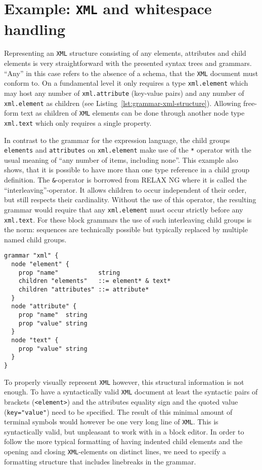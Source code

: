 \documentclass[sigconf,natbib=false]{acmart}
\newcommand{\enquote}[1]{``#1''}
\begin{document}
\section{Example: \texttt{XML} and whitespace handling}

Representing an \texttt{XML} structure consisting of any elements, attributes and child elements is very straightforward with the presented syntax trees and grammars. \enquote{Any} in this case refers to the absence of a schema, that the \texttt{XML} document must conform to. On a fundamental level it only requires a type \texttt{xml.element} which may host any number of \texttt{xml.attribute} (key-value pairs) and any number of \texttt{xml.element} as children (see Listing~\ref{lst:grammar-xml-structure}). Allowing free-form text as children of \texttt{XML} elements can be done through another node type \texttt{xml.text} which only requires a single property.

In contrast to the grammar for the expression language, the child groups \texttt{elements} and \texttt{attributes} on \texttt{xml.element} make use of the \texttt{*} operator with the usual meaning of \enquote{any number of items, including none}. This example also shows, that it is possible to have more than one type reference in a child group definition. The \texttt{\&}-operator is borrowed from RELAX NG where it is called the \enquote{interleaving}-operator. It allows children to occur independent of their order, but still respects their cardinality. Without the use of this operator, the resulting grammar would require that any \texttt{xml.element} must occur strictly before any \texttt{xml.text}. For these block grammars the use of such interleaving child groups is the norm: sequences are technically possible but typically replaced by multiple named child groups.

\begin{lstlisting}[float, caption={Semantic structure of \texttt{XML}}, label=lst:grammar-xml-structure]
grammar "xml" {
  node "element" {
    prop "name"           string
    children "elements"   ::= element* & text*
    children "attributes" ::= attribute*
  }
  node "attribute" {
    prop "name"  string
    prop "value" string
  }
  node "text" {
    prop "value" string
  }
}
\end{lstlisting}

To properly visually represent \texttt{XML} however, this structural information is not enough. To have a syntactically valid \texttt{XML} document at least the syntactic pairs of brackets (\texttt{<element>}) and the attributes equality sign and the quoted value (\texttt{key="value"}) need to be specified. The result of this minimal amount of terminal symbols would however be one very long line of \texttt{XML}. This is syntactically valid, but unpleasant to work with in a block editor. In order to follow the more typical formatting of having indented child elements and the opening and closing \texttt{XML}-elements on distinct lines, we need to specify a formatting structure that includes linebreaks in the grammar.
\end{document}
